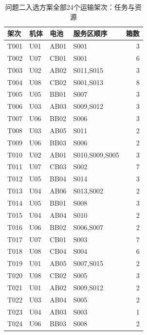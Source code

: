 \begin{table}[H]\centering\normalsize
\caption{问题二入选方案全部24个运输架次：任务与资源}\label{tab:q2_flights}
\begin{tabular}{llllr}
\toprule
架次 & 机体 & 电池 & 服务区顺序 & 箱数\\\midrule
T001 & U01 & AB01 & S001 & 3\\
T002 & U07 & CB01 & S001 & 6\\
T003 & U02 & AB02 & S011,S015 & 3\\
T004 & U08 & CB02 & S001,S013 & 8\\
T005 & U05 & BB01 & S007 & 3\\
T006 & U03 & AB03 & S009,S012 & 3\\
T007 & U06 & BB02 & S006 & 3\\
T008 & U03 & AB05 & S011 & 2\\
T009 & U06 & BB03 & S006 & 2\\
T010 & U02 & AB01 & S010,S009,S005 & 3\\
T011 & U07 & CB03 & S002 & 7\\
T012 & U05 & BB04 & S014 & 3\\
T013 & U04 & AB06 & S013,S002 & 2\\
T014 & U05 & BB01 & S008 & 3\\
T015 & U04 & AB04 & S010 & 2\\
T016 & U06 & BB02 & S006,S007 & 2\\
T017 & U07 & CB01 & S003 & 7\\
T018 & U08 & CB04 & S004 & 6\\
T019 & U01 & AB05 & S007,S015 & 2\\
T020 & U08 & CB02 & S005 & 3\\
T021 & U01 & AB02 & S009,S012 & 2\\
T022 & U03 & AB04 & S005 & 2\\
T023 & U04 & AB03 & S003 & 1\\
T024 & U06 & BB03 & S008 & 2\\
\bottomrule\end{tabular}
\end{table}
